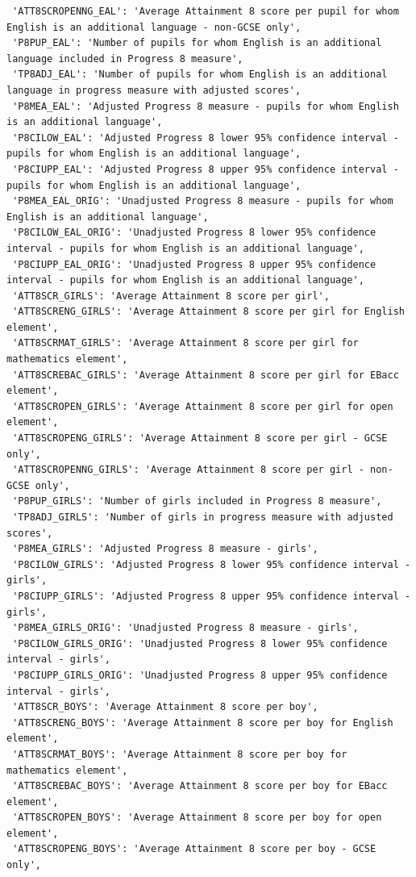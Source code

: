 \documentclass[
  letterpaper,
  DIV=11,
  numbers=noendperiod]{scrartcl}
\begin{document}
\begin{verbatim}
 'ATT8SCROPENNG_EAL': 'Average Attainment 8 score per pupil for whom English is an additional language - non-GCSE only',
 'P8PUP_EAL': 'Number of pupils for whom English is an additional language included in Progress 8 measure',
 'TP8ADJ_EAL': 'Number of pupils for whom English is an additional language in progress measure with adjusted scores',
 'P8MEA_EAL': 'Adjusted Progress 8 measure - pupils for whom English is an additional language',
 'P8CILOW_EAL': 'Adjusted Progress 8 lower 95% confidence interval - pupils for whom English is an additional language',
 'P8CIUPP_EAL': 'Adjusted Progress 8 upper 95% confidence interval - pupils for whom English is an additional language',
 'P8MEA_EAL_ORIG': 'Unadjusted Progress 8 measure - pupils for whom English is an additional language',
 'P8CILOW_EAL_ORIG': 'Unadjusted Progress 8 lower 95% confidence interval - pupils for whom English is an additional language',
 'P8CIUPP_EAL_ORIG': 'Unadjusted Progress 8 upper 95% confidence interval - pupils for whom English is an additional language',
 'ATT8SCR_GIRLS': 'Average Attainment 8 score per girl',
 'ATT8SCRENG_GIRLS': 'Average Attainment 8 score per girl for English element',
 'ATT8SCRMAT_GIRLS': 'Average Attainment 8 score per girl for mathematics element',
 'ATT8SCREBAC_GIRLS': 'Average Attainment 8 score per girl for EBacc element',
 'ATT8SCROPEN_GIRLS': 'Average Attainment 8 score per girl for open element',
 'ATT8SCROPENG_GIRLS': 'Average Attainment 8 score per girl - GCSE only',
 'ATT8SCROPENNG_GIRLS': 'Average Attainment 8 score per girl - non-GCSE only',
 'P8PUP_GIRLS': 'Number of girls included in Progress 8 measure',
 'TP8ADJ_GIRLS': 'Number of girls in progress measure with adjusted scores',
 'P8MEA_GIRLS': 'Adjusted Progress 8 measure - girls',
 'P8CILOW_GIRLS': 'Adjusted Progress 8 lower 95% confidence interval - girls',
 'P8CIUPP_GIRLS': 'Adjusted Progress 8 upper 95% confidence interval - girls',
 'P8MEA_GIRLS_ORIG': 'Unadjusted Progress 8 measure - girls',
 'P8CILOW_GIRLS_ORIG': 'Unadjusted Progress 8 lower 95% confidence interval - girls',
 'P8CIUPP_GIRLS_ORIG': 'Unadjusted Progress 8 upper 95% confidence interval - girls',
 'ATT8SCR_BOYS': 'Average Attainment 8 score per boy',
 'ATT8SCRENG_BOYS': 'Average Attainment 8 score per boy for English element',
 'ATT8SCRMAT_BOYS': 'Average Attainment 8 score per boy for mathematics element',
 'ATT8SCREBAC_BOYS': 'Average Attainment 8 score per boy for EBacc element',
 'ATT8SCROPEN_BOYS': 'Average Attainment 8 score per boy for open element',
 'ATT8SCROPENG_BOYS': 'Average Attainment 8 score per boy - GCSE only',

\end{verbatim}
\end{document}
